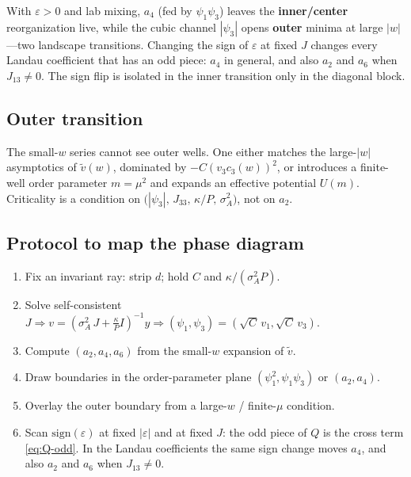 \documentclass[11pt,a4paper]{article}
\begin{document}
\vspace{0.5em}
\noindent
With $\varepsilon>0$ and lab mixing, $a_4$ (fed by $\psi_1\psi_3$) leaves the
\textbf{inner/center} reorganization live, while the cubic channel $|\psi_3|$
opens \textbf{outer} minima at large $|w|$---two landscape transitions.
Changing the sign of $\varepsilon$ at fixed $J$ changes every Landau coefficient
that has an odd piece: $a_4$ in general, and also $a_2$ and $a_6$ when $J_{13}\neq 0$.
The sign flip is isolated in the inner transition only in the diagonal block.

\subsection{Outer transition}

The small-$w$ series cannot see outer wells.
One either matches the large-$|w|$ asymptotics of $\tilde v(w)$, dominated by
$-C(v_3 c_3(w))^2$, or introduces a finite-well order parameter $m=\mu^2$ and
expands an effective potential $U(m)$.
Criticality is a condition on $\bigl(|\psi_3|,\,J_{33},\,\kappa/P,\,\sigma_A^2\bigr)$, not on $a_2$.

\subsection{Protocol to map the phase diagram}
\begin{enumerate}
  \item Fix an invariant ray: strip $d$; hold $C$ and $\kappa/(\sigma_A^2 P)$.
  \item Solve self-consistent
        $J\Rightarrow v=(\sigma_A^2\, J+\tfrac{\kappa}{P}I)^{-1}y\Rightarrow(\psi_1,\psi_3)=(\sqrt{C}\,v_1,\sqrt{C}\,v_3)$.
  \item Compute $(a_2,a_4,a_6)$ from the small-$w$ expansion of $\tilde v$.
  \item Draw boundaries in the order-parameter plane $(\psi_1^2,\psi_1\psi_3)$ or $(a_2,a_4)$.
  \item Overlay the outer boundary from a large-$w$ / finite-$\mu$ condition.
  \item Scan $\mathrm{sign}(\varepsilon)$ at fixed $|\varepsilon|$ and at fixed $J$:
        the odd piece of $Q$ is the cross term \eqref{eq:Q-odd}.
        In the Landau coefficients the same sign change moves $a_4$, and also
        $a_2$ and $a_6$ when $J_{13}\neq 0$.
\end{enumerate}

\end{document}
